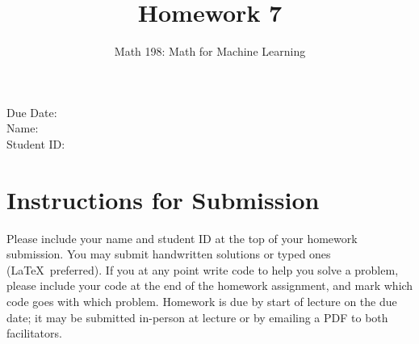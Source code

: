 \documentclass{article}
\title{Homework 7}
\author{Math 198: Math for Machine Learning}
\date{}
\begin{document}
\maketitle

\noindent
Due Date:  \\
Name: \\
Student ID:

\section*{Instructions for Submission}
Please include your name and student ID at the top of your homework submission. You may submit handwritten solutions or typed ones (\LaTeX\ preferred). If you at any point write code to help you solve a problem, please include your code at the end of the homework assignment, and mark which code goes with which problem. Homework is due by start of lecture on the due date; it may be submitted in-person at lecture or by emailing a PDF to both facilitators.
\end{document}
